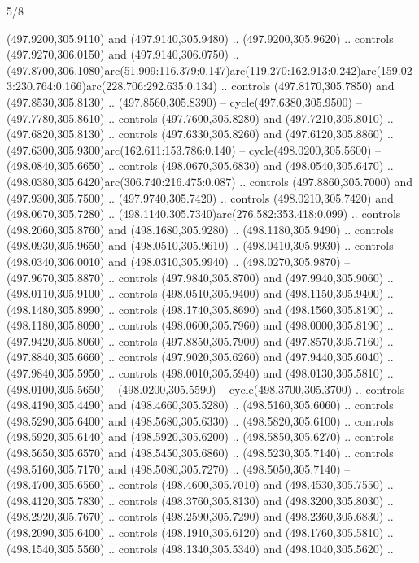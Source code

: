 \begin{flagdescription}{5/8}
\begin{scope}[xshift=0.5\flaglength,yshift=0.5\flagwidth,scale=\flagwidth/475.63]
\begin{scope}[y=0.8pt, x=0.8pt, yscale=-1, xscale=1,shift={(-450,-300)}]
\begin{scope}[cm={{1.0,0.0,0.0,1.0,(-0.0002,0.12556)}},cm={{1.0,0.0,0.0,1.0,(0.00179,0.0)}}]
\begin{scope}[cm={{1.11592,0.0,0.0,1.11592,(-106.89933,-41.77764)}}]
\begin{scope}[draw=black,fill=cfff]
\begin{scope}[fill=black]
  (497.9200,305.9110) and (497.9140,305.9480) .. (497.9200,305.9620) .. controls
  (497.9270,306.0150) and (497.9140,306.0750) ..
  (497.8700,306.1080)arc(51.909:116.379:0.147)arc(119.270:162.913:0.242)arc(159.023:230.764:0.166)arc(228.706:292.635:0.134)
  .. controls (497.8170,305.7850) and (497.8530,305.8130) .. (497.8560,305.8390)
  -- cycle(497.6380,305.9500) -- (497.7780,305.8610) .. controls
  (497.7600,305.8280) and (497.7210,305.8010) .. (497.6820,305.8130) .. controls
  (497.6330,305.8260) and (497.6120,305.8860) ..
  (497.6300,305.9300)arc(162.611:153.786:0.140) -- cycle(498.0200,305.5600) --
  (498.0840,305.6650) .. controls (498.0670,305.6830) and (498.0540,305.6470) ..
  (498.0380,305.6420)arc(306.740:216.475:0.087) .. controls (497.8860,305.7000)
  and (497.9300,305.7500) .. (497.9740,305.7420) .. controls (498.0210,305.7420)
  and (498.0670,305.7280) .. (498.1140,305.7340)arc(276.582:353.418:0.099) ..
  controls (498.2060,305.8760) and (498.1680,305.9280) .. (498.1180,305.9490) ..
  controls (498.0930,305.9650) and (498.0510,305.9610) .. (498.0410,305.9930) ..
  controls (498.0340,306.0010) and (498.0310,305.9940) .. (498.0270,305.9870) --
  (497.9670,305.8870) .. controls (497.9840,305.8700) and (497.9940,305.9060) ..
  (498.0110,305.9100) .. controls (498.0510,305.9400) and (498.1150,305.9400) ..
  (498.1480,305.8990) .. controls (498.1740,305.8690) and (498.1560,305.8190) ..
  (498.1180,305.8090) .. controls (498.0600,305.7960) and (498.0000,305.8190) ..
  (497.9420,305.8060) .. controls (497.8850,305.7900) and (497.8570,305.7160) ..
  (497.8840,305.6660) .. controls (497.9020,305.6260) and (497.9440,305.6040) ..
  (497.9840,305.5950) .. controls (498.0010,305.5940) and (498.0130,305.5810) ..
  (498.0100,305.5650) -- (498.0200,305.5590) -- cycle(498.3700,305.3700) ..
  controls (498.4190,305.4490) and (498.4660,305.5280) .. (498.5160,305.6060) ..
  controls (498.5290,305.6400) and (498.5680,305.6330) .. (498.5820,305.6100) ..
  controls (498.5920,305.6140) and (498.5920,305.6200) .. (498.5850,305.6270) ..
  controls (498.5650,305.6570) and (498.5450,305.6860) .. (498.5230,305.7140) ..
  controls (498.5160,305.7170) and (498.5080,305.7270) .. (498.5050,305.7140) --
  (498.4700,305.6560) .. controls (498.4600,305.7010) and (498.4530,305.7550) ..
  (498.4120,305.7830) .. controls (498.3760,305.8130) and (498.3200,305.8030) ..
  (498.2920,305.7670) .. controls (498.2590,305.7290) and (498.2360,305.6830) ..
  (498.2090,305.6400) .. controls (498.1910,305.6120) and (498.1760,305.5810) ..
  (498.1540,305.5560) .. controls (498.1340,305.5340) and (498.1040,305.5620) ..

\end{scope}
\end{scope}
\end{scope}
\end{scope}
\end{scope}
\end{scope}
\end{flagdescription}
